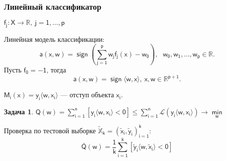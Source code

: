 \documentclass[unicode, notheorems]{beamer}
\newtheorem{task}{Задача}
\DeclareMathOperator{\sign}{sign}
\begin{document}
\begin{frame}
    \frametitle{Линейный классификатор}
$\mathsf{f_j:X\to\mathbb{R},~j=1,\ldots,p}$
 
 Линейная модель классификации: 
 \begin{equation*}
 \mathsf{a(x,w)=\sign (\sum\limits_{j=1}^pw_jf_j(x)-w_0),~~~w_0,w_1,\ldots,w_p\in\mathbb{R}}.
 \end{equation*}
 Пусть $\mathsf{f_0=-1}$, тогда
 \begin{equation*}
 \mathsf{a(x,w)=\sign\langle w,x\rangle ,~ x,w\in\mathbb{R}^{p+1}}.
 \end{equation*} 
 
 $\mathsf{M_i(x)=y_i\langle w,x_i\rangle}$ --- отступ объекта $\mathsf{x_i}$. 
 
 \begin{task}
 		$\mathsf{Q(w)=\sum \limits_{i=1}^n [y_i\langle w,x_i\rangle <0] \le \sum \limits_{i=1}^n \mathcal{L}(y_i\langle w,x_i\rangle) \to \min \limits_{w}}$
 \end{task}

Проверка по тестовой выборке $\tilde{\mathbb{X}}_\mathsf{k}=\mathsf{(\tilde{x}_i,\tilde{y}_i)_{i=1}^k}$:
\begin{equation*}
\mathsf{\bar{Q}(w)=\frac{1}{k}\sum\limits_{i=1}^k [\tilde{y}_i\langle w,\tilde{x}_i\rangle <0]}
\end{equation*}
\end{frame}
\end{document}
